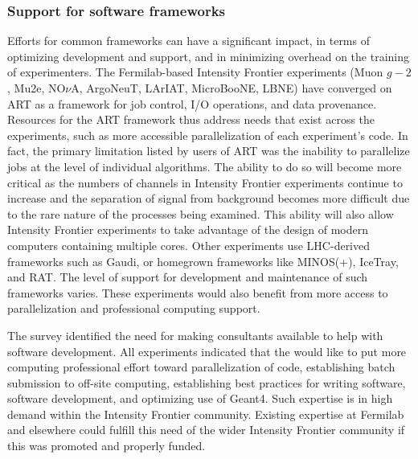 \subsubsection{Support for software frameworks}
Efforts for common frameworks can have a significant impact, in terms of optimizing  development and support, and in
minimizing overhead on the training of experimenters.  The Fermilab-based Intensity Frontier
experiments (Muon $g-2$, Mu2e, NO$\nu$A, ArgoNeuT, LArIAT, MicroBooNE, LBNE) have
converged on ART as a framework for job control, I/O operations, and data provenance. 
Resources for the ART framework thus address needs that
exist across the experiments, such as more accessible parallelization of each
experiment's code. In fact, the primary limitation listed by users of ART was
the inability to parallelize jobs at the level of individual algorithms.  The
ability to do so will become more critical as the numbers of channels in Intensity Frontier
experiments continue to increase and the separation of signal from background
becomes more difficult due to the rare nature of the processes being examined.
This ability will also allow Intensity Frontier experiments to take advantage of the design of
modern computers containing multiple cores. Other experiments use LHC-derived
frameworks such as Gaudi, or homegrown frameworks like MINOS(+), IceTray, and
RAT. The level of support for development and maintenance of such frameworks
varies. These experiments would also benefit from more access to
parallelization and professional computing support.

The survey identified the need for making consultants available to help with
software development. All experiments indicated that the would like to
put more computing professional effort toward parallelization of code,
establishing batch submission to off-site computing, establishing best
practices for writing software, software development, and  optimizing use of
Geant4. Such expertise is in high demand within the Intensity Frontier community. Existing expertise 
at Fermilab and elsewhere could fulfill this need of the
wider Intensity Frontier community if this was promoted and properly funded.

